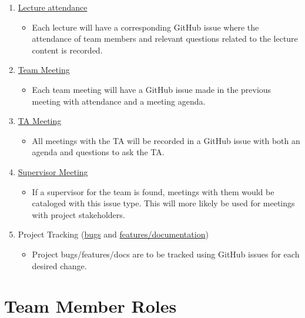 \documentclass{article}
\begin{document}
\begin{enumerate}
    \item \href{https://github.com/russellrd/realm/blob/main/.github/ISSUE_TEMPLATE/lect.md}{Lecture attendance}
    \begin{itemize}
        \item Each lecture will have a corresponding GitHub issue where the attendance of team members and relevant questions related to the lecture content is recorded.
    \end{itemize}
    \item \href{https://github.com/russellrd/realm/blob/main/.github/ISSUE_TEMPLATE/team_meet.md}{Team Meeting}
    \begin{itemize}
        \item Each team meeting will have a GitHub issue made in the previous meeting with attendance and a meeting agenda.
    \end{itemize}
    \item \href{https://github.com/russellrd/realm/blob/main/.github/ISSUE_TEMPLATE/ta_meet.md}{TA Meeting}
    \begin{itemize}
        \item All meetings with the TA will be recorded in a GitHub issue with both an agenda and questions to ask the TA.
    \end{itemize}
    \item \href{https://github.com/russellrd/realm/blob/main/.github/ISSUE_TEMPLATE/sup_meet.md}{Supervisor Meeting}
    \begin{itemize}
        \item If a supervisor for the team is found, meetings with them would be cataloged with this issue type. This will more likely be used for meetings with project stakeholders.
    \end{itemize}
    \item Project Tracking (\href{https://github.com/russellrd/realm/blob/main/.github/ISSUE_TEMPLATE/bug.md}{bugs} and \href{https://github.com/russellrd/realm/blob/main/.github/ISSUE_TEMPLATE/feature_or_doc.md}{features/documentation})
    \begin{itemize}
        \item Project bugs/features/docs are to be tracked using GitHub issues for each desired change.
    \end{itemize}
\end{enumerate}

\pagebreak

\section{Team Member Roles} \label{team_member_roles}
\end{document}

